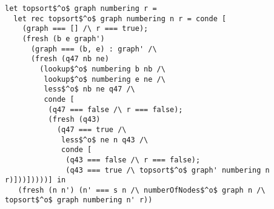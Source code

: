 \begin{figure*}[!t]
  \centering
  \begin{minipage}{\textwidth}
    \begin{lstlisting}[label={topsort_rel}, caption={Relational intepreter for topologic sort of a graph}, captionpos=b, frame=tb]
let topsort$^o$ graph numbering r =
  let rec topsort$^o$ graph numbering n r = conde [
    (graph === [] /\ r === true);
    (fresh (b e graph')
      (graph === (b, e) : graph' /\
      (fresh (q47 nb ne)
        (lookup$^o$ numbering b nb /\
         lookup$^o$ numbering e ne /\
         less$^o$ nb ne q47 /\
         conde [
          (q47 === false /\ r === false);
          (fresh (q43)
            (q47 === true /\
             less$^o$ ne n q43 /\
             conde [
              (q43 === false /\ r === false);
              (q43 === true /\ topsort$^o$ graph' numbering n r)]))]))))] in
   (fresh (n n') (n' === s n /\ numberOfNodes$^o$ graph n /\ topsort$^o$ graph numbering n' r))
    \end{lstlisting}
  \end{minipage}
\end{figure*}
